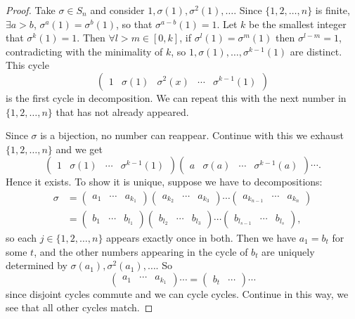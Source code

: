 \documentclass[a4paper]{article}
\begin{document}
\begin{proof}
  Take $ \sigma\in S_n $ and consider $ 1,\sigma(1),\sigma^2(1),\dots
  $. Since $ \{1,2,\dots,n\} $ is finite, $ \exists a>b $, $
  \sigma^a(1)=\sigma^b(1) $, so that $ \sigma^{a-b}(1)=1 $. Let $k$
  be the smallest integer that $ \sigma^{k}(1)=1 $. Then $ \forall
  l>m\in [0,k] $, if $ \sigma^{l}(1)=\sigma^{m}(1) $ then $
  \sigma^{l-m}=1 $, contradicting with the minimality of $k$, so $
  1,\sigma(1),\dots,\sigma^{k-1}(1) $ are distinct. This cycle
  \[
    \begin{pmatrix}
      1&\sigma(1)&\sigma^2(x)&\cdots&\sigma^{k-1}(1)
    \end{pmatrix}
  \]
  is the first cycle in decomposition. We can repeat this with the
  next number in $\{1,2,\dots,n\}$ that has not already appeared.

  Since $ \sigma $ is a bijection, no number can reappear. Continue
  with this we exhaust $\{1,2,\dots,n\}$ and we get
  \[
    \begin{pmatrix}
      1&\sigma(1)&\cdots&\sigma^{k-1}(1)
    \end{pmatrix}
    \begin{pmatrix}
      a&\sigma(a)&\cdots&\sigma^{k-1}(a)
    \end{pmatrix}
    \cdots
  .\]
  Hence it exists. To show it is unique, suppose we have to decompositions:
  \[
    \begin{aligned}
      \sigma&=
      \begin{pmatrix} a_1&\cdots&a_{k_1}
      \end{pmatrix}
      \begin{pmatrix} a_{k_2}&\cdots&a_{k_3}
      \end{pmatrix}\cdots
      \begin{pmatrix} a_{k_{n-1}}&\cdots&a_{k_n}
      \end{pmatrix}\\
      &=
      \begin{pmatrix} b_1&\cdots&b_{l_1}
      \end{pmatrix}
      \begin{pmatrix} b_{l_2}&\cdots&b_{l_3}
      \end{pmatrix}\cdots
      \begin{pmatrix} b_{l_{s-1}}&\cdots&b_{l_s}
      \end{pmatrix},
    \end{aligned}
  \]
  so each $ j\in \{1,2,\dots,n\} $ appears exactly once in both. Then
  we have $ a_1=b_t $ for some $t$, and the other numbers appearing
  in the cycle of $b_t$ are uniquely determined by $
  \sigma(a_1),\sigma^2(a_1),\dots $. So
  \[
    \begin{pmatrix} a_1&\cdots&a_{k_1}
    \end{pmatrix}\cdots =
    \begin{pmatrix} b_t&\cdots
    \end{pmatrix}\cdots
  \]
  since disjoint cycles commute and we can cycle cycles. Continue in
  this way, we see that all other cycles match.
\end{proof}
\end{document}
